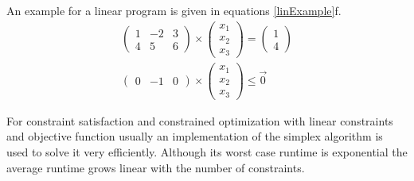 An example for a linear program is given in equations \ref{linExample}f.
\begin{eqnarray}
\label{linExample}
\begin{pmatrix}
1 & -2 & 3 \\
4 & 5 & 6 
\end{pmatrix}\times\begin{pmatrix}
x_1 \\ x_2 \\ x_3
\end{pmatrix} = \begin{pmatrix}
1 \\ 4
\end{pmatrix}\\
\begin{pmatrix}
0&-1&0
\end{pmatrix}\times\begin{pmatrix}
x_1 \\ x_2 \\ x_3
\end{pmatrix}\leq \vec{0}
\end{eqnarray}

For constraint satisfaction and constrained optimization with linear constraints and objective function usually an implementation of the simplex algorithm\cite{dantzig63Simplex} is used to solve it very efficiently. Although its worst case runtime is exponential the average runtime grows linear with the number of constraints.

